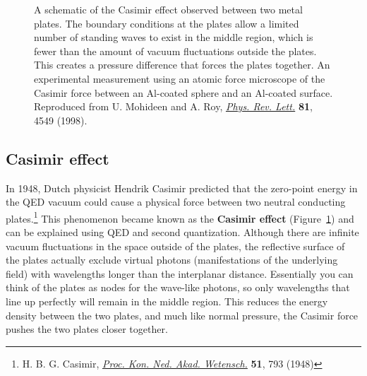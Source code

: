 
\begin{figure}[!h]
	\centering
	 \hspace{2ex}
	\caption{\protect{} A schematic of the Casimir effect observed between two metal plates. The boundary conditions at the plates allow a limited number of standing waves to exist in the middle region, which is fewer than the amount of vacuum fluctuations outside the plates. This creates a pressure difference that forces the plates together. \protect{} An experimental measurement using an atomic force microscope of the Casimir force between an Al-coated sphere and an Al-coated surface. Reproduced from U. Mohideen and A. Roy, \href{https://journals.aps.org/prl/abstract/10.1103/PhysRevLett.81.4549}{\emph{Phys. Rev. Lett.}} \textbf{81}, 4549 (1998).}
	\label{fig:casimir}
\end{figure}

\subsection{Casimir effect}
In 1948, Dutch physicist Hendrik Casimir predicted that the zero-point energy in the QED vacuum could cause a physical force between two neutral conducting plates.\footnote{H. B. G. Casimir, \href{http://www.dwc.knaw.nl/DL/publications/PU00018547.pdf}{\emph{Proc. Kon. Ned. Akad. Wetensch.}} \textbf{51}, 793 (1948)} This phenomenon became known as the \textbf{Casimir effect} (Figure~\ref{fig:casimir}) and can be explained using QED and second quantization. Although there are infinite vacuum fluctuations in the space outside of the plates, the reflective surface of the plates actually exclude virtual photons (manifestations of the underlying field) with wavelengths longer than the interplanar distance. Essentially you can think of the plates as nodes for the wave-like photons, so only wavelengths that line up perfectly will remain in the middle region. This reduces the energy density between the two plates, and much like normal pressure, the Casimir force pushes the two plates closer together. \par 

